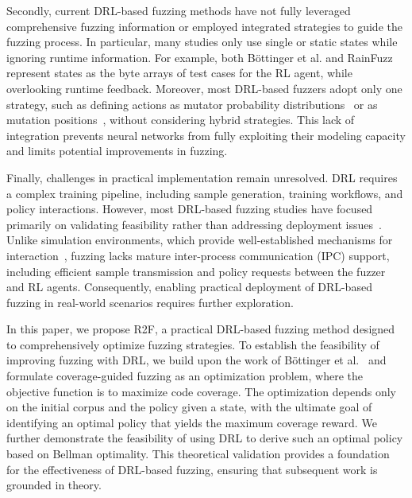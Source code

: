 \documentclass[lettersize,journal]{IEEEtran}
\begin{document}
Secondly, current DRL-based fuzzing methods have not fully leveraged comprehensive fuzzing information or employed integrated strategies to guide the fuzzing process. In particular, many studies only use single or static states while ignoring runtime information. For example, both Böttinger et al. and RainFuzz represent states as the byte arrays of test cases for the RL agent, while overlooking runtime feedback. Moreover, most DRL-based fuzzers adopt only one strategy, such as defining actions as mutator probability distributions~\cite{bottingerDeepReinforcementFuzzing2018,gongDRLFCfuzzerFuzzingDeepReinforcementLearning2022} or as mutation positions~\cite{binosiRainfuzzReinforcementlearningDriven2023}, without considering hybrid strategies. This lack of integration prevents neural networks from fully exploiting their modeling capacity and limits potential improvements in fuzzing.

Finally, challenges in practical implementation remain unresolved. DRL requires a complex training pipeline, including sample generation, training workflows, and policy interactions. However, most DRL-based fuzzing studies have focused primarily on validating feasibility rather than addressing deployment issues~\cite{bottingerDeepReinforcementFuzzing2018,binosiRainfuzzReinforcementlearningDriven2023,gongDRLFCfuzzerFuzzingDeepReinforcementLearning2022}. Unlike simulation environments, which provide well-established mechanisms for interaction~\cite{towersGymnasiumStandardInterface2024,drozdFuzzerGymCompetitiveFramework2018}, fuzzing lacks mature inter-process communication (IPC) support, including efficient sample transmission and policy requests between the fuzzer and RL agents. Consequently, enabling practical deployment of DRL-based fuzzing in real-world scenarios requires further exploration.

In this paper, we propose R2F, a practical DRL-based fuzzing method designed to comprehensively optimize fuzzing strategies. To establish the feasibility of improving fuzzing with DRL, we build upon the work of Böttinger et al.~\cite{bottingerDeepReinforcementFuzzing2018} and formulate coverage-guided fuzzing as an optimization problem, where the objective function is to maximize code coverage. The optimization depends only on the initial corpus and the policy given a state, with the ultimate goal of identifying an optimal policy that yields the maximum coverage reward. We further demonstrate the feasibility of using DRL to derive such an optimal policy based on Bellman optimality. This theoretical validation provides a foundation for the effectiveness of DRL-based fuzzing, ensuring that subsequent work is grounded in theory.
\end{document}

